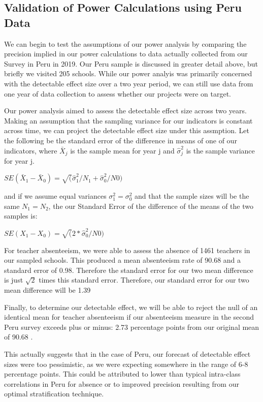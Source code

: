 \documentclass[]{article}
\begin{document}
\hypertarget{validation-of-power-calculations-using-peru-data}{%
\subsection{Validation of Power Calculations using Peru
Data}\label{validation-of-power-calculations-using-peru-data}}

We can begin to test the assumptions of our power analysis by comparing
the precision implied in our power calculations to data actually
collected from our Survey in Peru in 2019. Our Peru sample is discussed
in greater detail above, but briefly we visited 205 schools. While our
power analyis was primarily concerned with the detectable effect size
over a two year period, we can still use data from one year of data
collection to assess whether our projects were on target.

Our power analysis aimed to assess the detectable effect size across two
years. Making an assumption that the sampling variance for our
indicators is constant across time, we can project the detectable effect
size under this assmption. Let the following be the standard error of
the difference in means of one of our indicators, where \(\bar X_j\) is
the sample mean for year j and \(\hat \sigma^2_j\) is the sample
variance for year j.

\(SE(\bar X_1-\bar X_0)=\sqrt(\hat \sigma^2_1/N_1 + \hat \sigma^2_0/N0)\)

and if we assume equal variances \(\sigma^2_1=\sigma^2_0\) and that the
sample sizes will be the same \(N_1=N_2\), the our Standard Error of the
difference of the means of the two samples is:

\(SE(X_1-X_0)=\sqrt(2* \hat \sigma^2_0/N0)\)

For teacher absenteeism, we were able to assess the absence of 1461
teachers in our sampled schools. This produced a mean absenteeism rate
of 90.68 and a standard error of 0.98. Therefore the standard error for
our two mean difference is just \(\sqrt 2\) times this standard error.
Therefore, our standard error for our two mean difference will be 1.39

Finally, to determine our detectable effect, we will be able to reject
the null of an identical mean for teacher absenteeism if our absenteeism
measure in the second Peru survey exceeds plus or minus: 2.73 percentage
points from our original mean of 90.68 .

This actually suggests that in the case of Peru, our forecast of
detectable effect sizes were too pessimistic, as we were expecting
somewhere in the range of 6-8 percentage points. This could be
attributed to lower than typical intra-class correlations in Peru for
absence or to improved precision resulting from our optimal
stratification technique.
\end{document}
